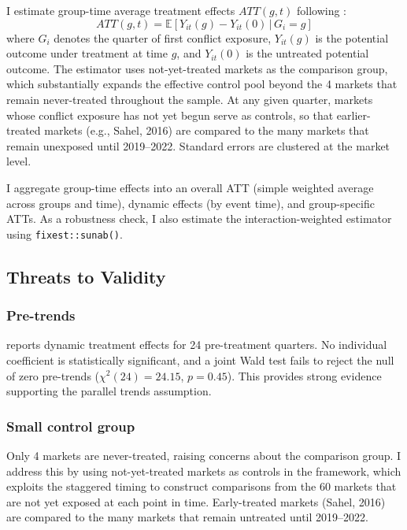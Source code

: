 \documentclass[12pt]{article}
\newcommand{\E}{\mathbb{E}}
\begin{document}
I estimate group-time average treatment effects $ATT(g,t)$ following \citet{callaway2021difference}:
\begin{equation}
ATT(g,t) = \E\left[Y_{it}(g) - Y_{it}(0) \,\big|\, G_i = g\right]
\end{equation}
where $G_i$ denotes the quarter of first conflict exposure, $Y_{it}(g)$ is the potential outcome under treatment at time $g$, and $Y_{it}(0)$ is the untreated potential outcome. The estimator uses not-yet-treated markets as the comparison group, which substantially expands the effective control pool beyond the 4 markets that remain never-treated throughout the sample. At any given quarter, markets whose conflict exposure has not yet begun serve as controls, so that earlier-treated markets (e.g., Sahel, 2016) are compared to the many markets that remain unexposed until 2019--2022. Standard errors are clustered at the market level.

I aggregate group-time effects into an overall ATT (simple weighted average across groups and time), dynamic effects (by event time), and group-specific ATTs. As a robustness check, I also estimate the \citet{sun2021estimating} interaction-weighted estimator using \texttt{fixest::sunab()}.

\subsection{Threats to Validity}

\subsubsection*{Pre-trends}  reports dynamic treatment effects for 24 pre-treatment quarters. No individual coefficient is statistically significant, and a joint Wald test fails to reject the null of zero pre-trends ($\chi^2(24) = 24.15$, $p = 0.45$). This provides strong evidence supporting the parallel trends assumption.

\subsubsection*{Small control group} Only 4 markets are never-treated, raising concerns about the comparison group. I address this by using not-yet-treated markets as controls in the \citet{callaway2021difference} framework, which exploits the staggered timing to construct comparisons from the 60 markets that are not yet exposed at each point in time. Early-treated markets (Sahel, 2016) are compared to the many markets that remain untreated until 2019--2022.
\end{document}
